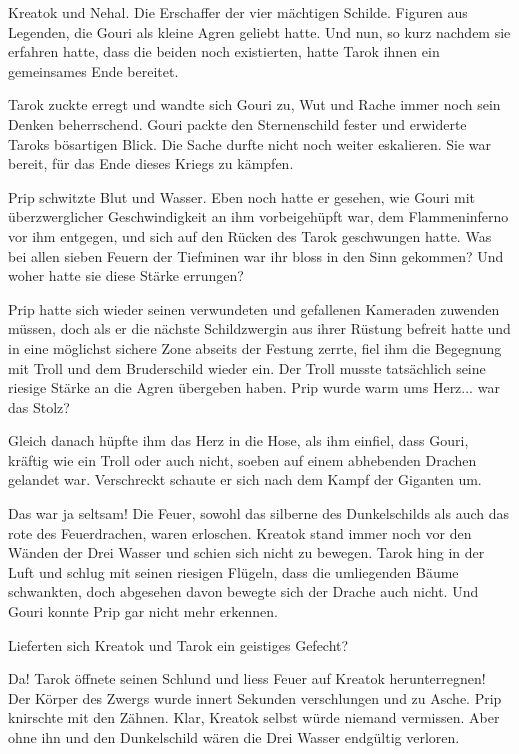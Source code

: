 Kreatok und Nehal. Die Erschaffer der vier mächtigen Schilde. Figuren aus Legenden, die Gouri als kleine Agren geliebt hatte. Und nun, so kurz nachdem sie erfahren hatte, dass die beiden noch existierten, hatte Tarok ihnen ein gemeinsames Ende bereitet.

Tarok zuckte erregt und wandte sich Gouri zu, Wut und Rache immer noch sein Denken beherrschend. Gouri packte den Sternenschild fester und erwiderte Taroks bösartigen Blick. Die Sache durfte nicht noch weiter eskalieren. Sie war bereit, für das Ende dieses Kriegs zu kämpfen.



\trennzeichen



Prip schwitzte Blut und Wasser. Eben noch hatte er gesehen, wie Gouri mit überzwerglicher Geschwindigkeit an ihm vorbeigehüpft war, dem Flammeninferno vor ihm entgegen, und sich auf den Rücken des Tarok geschwungen hatte. Was bei allen sieben Feuern der Tiefminen war ihr bloss in den Sinn gekommen? Und woher hatte sie diese Stärke errungen?

Prip hatte sich wieder seinen verwundeten und gefallenen Kameraden zuwenden müssen, doch als er die nächste Schildzwergin aus ihrer Rüstung befreit hatte und in eine möglichst sichere Zone abseits der Festung zerrte, fiel ihm die Begegnung mit Troll und dem Bruderschild wieder ein. Der Troll musste tatsächlich seine riesige Stärke an die Agren übergeben haben. Prip wurde warm ums Herz... war das Stolz?

Gleich danach hüpfte ihm das Herz in die Hose, als ihm einfiel, dass Gouri, kräftig wie ein Troll oder auch nicht, soeben auf einem abhebenden Drachen gelandet war. Verschreckt schaute er sich nach dem Kampf der Giganten um.

Das war ja seltsam! Die Feuer, sowohl das silberne des Dunkelschilds als auch das rote des Feuerdrachen, waren erloschen. Kreatok stand immer noch vor den Wänden der Drei Wasser und schien sich nicht zu bewegen. Tarok hing in der Luft und schlug mit seinen riesigen Flügeln, dass die umliegenden Bäume schwankten, doch abgesehen davon bewegte sich der Drache auch nicht. Und Gouri konnte Prip gar nicht mehr erkennen.

Lieferten sich Kreatok und Tarok ein geistiges Gefecht?

Da! Tarok öffnete seinen Schlund und liess Feuer auf Kreatok herunterregnen! Der Körper des Zwergs wurde innert Sekunden verschlungen und zu Asche. Prip knirschte mit den Zähnen. Klar, Kreatok selbst würde niemand vermissen. Aber ohne ihn und den Dunkelschild wären die Drei Wasser endgültig verloren.

